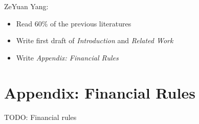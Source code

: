 \documentclass{article}
\begin{document}
\noindent
ZeYuan Yang:

\begin{itemize}
    \item Read 60\% of the previous literatures
    \item Write first draft of \textit{Introduction} and \textit{Related Work}
    \item Write \textit{Appendix: Financial Rules}
\end{itemize}





\section{Appendix: Financial Rules}\label{section-appendix-financial-rules}

TODO: Financial rules



\end{document}
